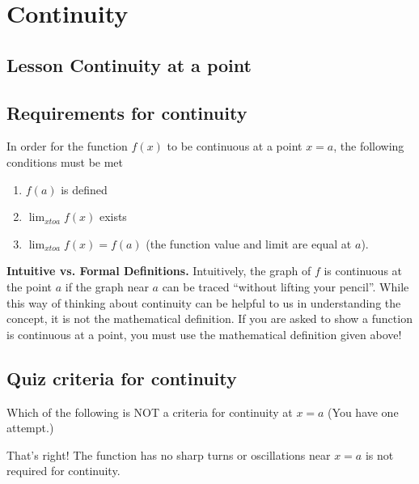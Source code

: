 \documentclass{ximera}
\begin{document}
\section{Continuity}

\subsection{Lesson Continuity at a point}

\begin{center}
\end{center}

\subsection{Requirements for continuity}

In order for the function $f(x)$ to be continuous at a point $x=a$, the following conditions must be met
\begin{enumerate}
    \item $f(a)$ is defined
    \item $\lim_{x to a} f(x)$ exists
    \item $\lim_{x to a} f(x) = f(a)$ (the function value and limit are equal at $a$).
\end{enumerate}

\begin{explanation}
    \begin{foldable}
        \textbf{Intuitive vs. Formal Definitions.} Intuitively, the graph of $f$ is continuous at the point $a$ if the graph near $a$ can be traced ``without lifting your pencil''. While this way of thinking about continuity can be helpful to us in understanding the concept, it is not the mathematical definition. If you are asked to show a function is continuous at a point, you must use the mathematical definition given above!
    \end{foldable}
\end{explanation}

\subsection{Quiz criteria for continuity}

\begin{question}
Which of the following is NOT a criteria for continuity at $x=a$ (You have one attempt.)
\begin{multipleChoice}  
\end{multipleChoice} 

\begin{explanation}
     That's right! The function has no sharp turns or oscillations near $x=a$ is not required for continuity.
 \end{explanation} 
\end{question}
\end{document}
